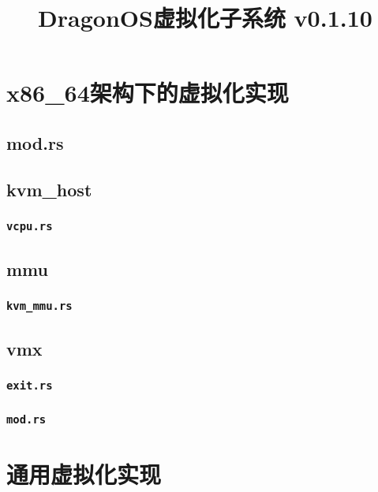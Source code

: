 \documentclass[code]{mancls}
\title{DragonOS虚拟化子系统 v0.1.10}
\begin{document}
\section{x86\_64架构下的虚拟化实现}

\subsection{mod.rs}


\subsection{kvm\_host}

\subsubsection{\texttt{vcpu.rs}}


\subsection{mmu}

\subsubsection{\texttt{kvm\_mmu.rs}}


\subsection{vmx}

\subsubsection{\texttt{exit.rs}}


\subsubsection{\texttt{mod.rs}}


\section{通用虚拟化实现}
\end{document}
